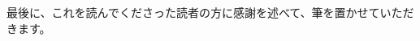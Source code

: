 \documentclass{jsarticle}
\begin{document}

 最後に、これを読んでくださった読者の方に感謝を述べて、筆を置かせていただきます。



\end{document}
